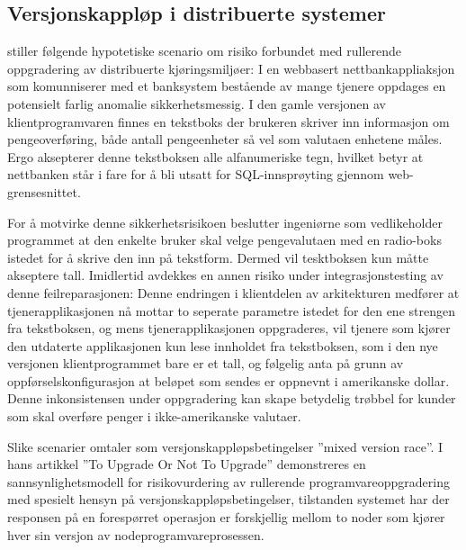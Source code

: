 \subsection{Versjonskappløp i distribuerte systemer}

\citep{dumitras2010upgrade} stiller følgende hypotetiske scenario om risiko forbundet med rullerende oppgradering av distribuerte kjøringsmiljøer: I en webbasert nettbankappliaksjon som komunniserer med et banksystem bestående av mange tjenere oppdages en potensielt farlig anomalie sikkerhetsmessig. I den gamle versjonen av klientprogramvaren finnes en tekstboks der brukeren skriver inn informasjon om pengeoverføring, både antall pengeenheter så vel som valutaen enhetene måles. Ergo aksepterer denne tekstboksen alle alfanumeriske tegn, hvilket betyr at nettbanken står i fare for å bli utsatt for SQL-innsprøyting gjennom web-grensesnittet.

For å motvirke denne sikkerhetsrisikoen beslutter ingeniørne som vedlikeholder programmet at den enkelte bruker skal velge pengevalutaen med en radio-boks istedet for å skrive den inn på tekstform. Dermed vil tesktboksen kun måtte akseptere tall. Imidlertid avdekkes en annen risiko under integrasjonstesting av denne feilreparasjonen: Denne endringen i klientdelen av arkitekturen medfører at tjenerapplikasjonen nå mottar to seperate parametre istedet for den ene strengen fra tekstboksen, og mens tjenerapplikasjonen oppgraderes, vil tjenere som kjører den utdaterte applikasjonen kun lese innholdet fra tekstboksen, som i den nye versjonen klientprogrammet bare er et tall, og følgelig anta på grunn av oppførselskonfigurasjon at beløpet som sendes er oppnevnt i amerikanske dollar. Denne inkonsistensen under oppgradering kan skape betydelig trøbbel for kunder som skal overføre penger i ikke-amerikanske valutaer.

Slike scenarier omtaler \citep{dumitras2010upgrade} som versjonskappløpsbetingelser ''mixed version race''. I hans artikkel ''To Upgrade Or Not To Upgrade'' demonstreres en sannsynlighetsmodell for risikovurdering av rullerende programvareoppgradering med spesielt hensyn på versjonskappløpsbetingelser, tilstanden systemet har der responsen på en forespørret operasjon er forskjellig mellom to noder som kjører hver sin versjon av nodeprogramvareprosessen.
